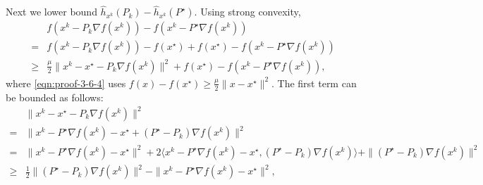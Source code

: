 Next we lower bound $\hat{h}_{x^k} (P_k) - \hat{h}_{x^k} (P^{\star})$. Using strong
convexity,
\begin{align}
  & f (x^k - P_k \nabla f (x^k)) - f (x^k - P^{\star} \nabla f (x^k))
  \nonumber\\
  ={} & f (x^k - P_k \nabla f (x^k)) - f (x^{\star}) + f (x^{\star}) - f (x^k -
  P^{\star} \nabla f (x^k)) \nonumber\\
  \geq{} & \tfrac{\mu}{2} \| x^k - x^{\star} - P_k \nabla f (x^k) \|^2 + f
  (x^{\star}) - f (x^k - P^{\star} \nabla f (x^k)),\label{eqn:proof-3-6-4}
\end{align}
where \eqref{eqn:proof-3-6-4} uses $f(x) - f(x^\star) \geq \frac{\mu}{2}\|x-x ^\star\|^2$.
The first term can be bounded as follows:
\begin{align}
  & \| x^k - x^{\star} - P_k \nabla f (x^k) \|^2 \nonumber\\
  ={} & \| x^k - P^{\star} \nabla f (x^k) - x^{\star} + (P^{\star} - P_k) \nabla
  f (x^k) \|^2 \nonumber\\
  ={} & \| x^k - P^{\star} \nabla f (x^k) - x^{\star} \|^2 + 2 \langle x^k -
  P^{\star} \nabla f (x^k) - x^{\star}, (P^{\star} - P_k) \nabla f (x^k)
  \rangle + \| (P^{\star} - P_k) \nabla f (x^k) \|^2 \nonumber\\
  \geq{} & \tfrac{1}{2} \| (P^{\star} - P_k) \nabla f (x^k) \|^2 - \| x^k -
  P^{\star} \nabla f (x^k) - x^{\star} \|^2, \nonumber
\end{align}


